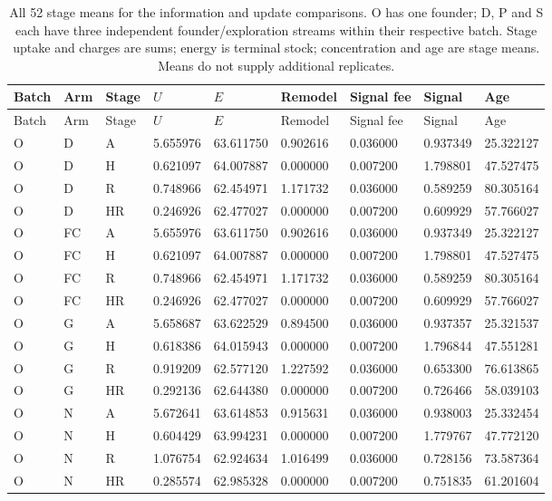 \begin{longtable}{lllllllll}
\caption{All 52 stage means for the information and update comparisons. O has one founder; D, P and S each have three independent founder/exploration streams within their respective batch. Stage uptake and charges are sums; energy is terminal stock; concentration and age are stage means. Means do not supply additional replicates.}\label{tab:reach-means}\\
\toprule
Batch & Arm & Stage & $U$ & $E$ & Remodel & Signal fee & Signal & Age\\
\midrule\endfirsthead
\toprule
Batch & Arm & Stage & $U$ & $E$ & Remodel & Signal fee & Signal & Age\\
\midrule\endhead
O & D & A & 5.655976 & 63.611750 & 0.902616 & 0.036000 & 0.937349 & 25.322127\\
O & D & H & 0.621097 & 64.007887 & 0.000000 & 0.007200 & 1.798801 & 47.527475\\
O & D & R & 0.748966 & 62.454971 & 1.171732 & 0.036000 & 0.589259 & 80.305164\\
O & D & HR & 0.246926 & 62.477027 & 0.000000 & 0.007200 & 0.609929 & 57.766027\\
O & FC & A & 5.655976 & 63.611750 & 0.902616 & 0.036000 & 0.937349 & 25.322127\\
O & FC & H & 0.621097 & 64.007887 & 0.000000 & 0.007200 & 1.798801 & 47.527475\\
O & FC & R & 0.748966 & 62.454971 & 1.171732 & 0.036000 & 0.589259 & 80.305164\\
O & FC & HR & 0.246926 & 62.477027 & 0.000000 & 0.007200 & 0.609929 & 57.766027\\
O & G & A & 5.658687 & 63.622529 & 0.894500 & 0.036000 & 0.937357 & 25.321537\\
O & G & H & 0.618386 & 64.015943 & 0.000000 & 0.007200 & 1.796844 & 47.551281\\
O & G & R & 0.919209 & 62.577120 & 1.227592 & 0.036000 & 0.653300 & 76.613865\\
O & G & HR & 0.292136 & 62.644380 & 0.000000 & 0.007200 & 0.726466 & 58.039103\\
O & N & A & 5.672641 & 63.614853 & 0.915631 & 0.036000 & 0.938003 & 25.332454\\
O & N & H & 0.604429 & 63.994231 & 0.000000 & 0.007200 & 1.779767 & 47.772120\\
O & N & R & 1.076754 & 62.924634 & 1.016499 & 0.036000 & 0.728156 & 73.587364\\
O & N & HR & 0.285574 & 62.985328 & 0.000000 & 0.007200 & 0.751835 & 61.201604\\

\end{longtable}
